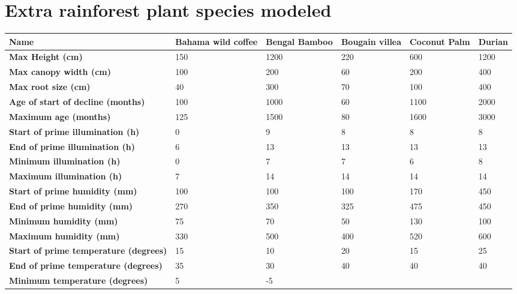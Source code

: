 \chapter{Extra rainforest plant species modeled} \label{AppendixG}

\begin{longtable}{|p{4cm}|p{2cm}|p{2cm}|p{2cm}|p{2cm}|p{2cm}|}
		\hline		
		\textbf{Name} & \textbf{Bahama wild coffee} & \textbf{Bengal Bamboo} & \textbf{Bougain villea} & \textbf{Coconut Palm} & \textbf{Durian}\\
		\hline
		\textbf{Max Height (cm)} & 
		150 & 
		1200 & 
		220 & 
		600 & 
		1200\\
		\hline
		\textbf{Max canopy width (cm)} & 
		100 & 
		200 & 
		60 & 
		200 & 
		400 \\
		\hline
		\textbf{Max root size (cm)} & 
		40 & 
		300 & 
		70 & 
		100 & 
		400 \\
		\hline
		\textbf{Age of start of decline (months)} & 
		100 & 
		1000 & 
		60 & 
		1100 & 
		2000 \\
		\hline
		\textbf{Maximum age (months)} & 
		125 & 
		1500 & 
		80 & 
		1600 & 
		3000 \\
		\hline
		\textbf{Start of prime illumination (h)} &
		0 & 
		9 & 
		8 & 
		8 & 
		8 \\
		\hline
		\textbf{End of prime illumination (h)} & 
		6 & 
		13 & 
		13 & 
		13 & 
		13 \\
		\hline
		\textbf{Minimum illumination (h)} & 
		0 & 
		7 & 
		7 & 
		6 & 
		8 \\
		\hline
		\textbf{Maximum illumination (h)} & 
		7 & 
		14 & 
		14 & 
		14 & 
		14 \\
		\hline
		\textbf{Start of prime humidity (mm)} & 
		100 & 
		100 & 
		100 & 
		170 & 
		450 \\
		\hline
		\textbf{End of prime humidity (mm)} & 
		270 & 
		350 & 
		325 & 
		475 & 
		450 \\
		\hline
		\textbf{Minimum humidity (mm)} &
		75 & 
		70 & 
		50 & 
		130 & 
		100 \\
		\hline
		\textbf{Maximum humidity (mm)} & 
		330 & 
		500 & 
		400 & 
		520 & 
		600 \\
		\hline
		\textbf{Start of prime temperature (degrees)} & 
		15 & 
		10 & 
		20 & 
		15 & 
		25 \\
		\hline
		\textbf{End of prime temperature (degrees)} & 
		35 & 
		30 & 
		40 & 
		40 & 
		40 \\
		\hline
		\textbf{Minimum temperature (degrees)} & 
		5 & 
		-5 & 

\end{longtable}
